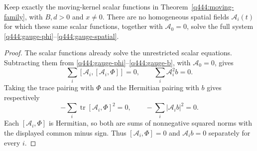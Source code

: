 \begin{theorem}
\label{q444:temporal-no-lift}
Keep exactly the moving-kernel scalar functions in
Theorem~\ref{q444:moving-family}, with $B,d>0$ and $x\neq0$.
There are no homogeneous spatial fields $\mathcal A_i(t)$ for which
these same scalar functions, together with $\mathcal A_0=0$, solve
the full system \eqref{q444:gauge-phi}--\eqref{q444:gauge-spatial}.
\end{theorem}
\begin{proof}
The scalar functions already solve the unrestricted scalar equations.
Subtracting them from \eqref{q444:gauge-phi}--\eqref{q444:gauge-b},
with $\mathcal A_0=0$, gives
\[
 \sum_i[\mathcal A_i,[\mathcal A_i,\Phi]]=0,\qquad
 \sum_i\mathcal A_i^2b=0.
\]
Taking the trace pairing with $\Phi$ and the Hermitian pairing with $b$
gives respectively
\[
 -\sum_i\operatorname{tr}[\mathcal A_i,\Phi]^2=0,\qquad
 -\sum_i|\mathcal A_i b|^2=0.
\]
Each $[\mathcal A_i,\Phi]$ is Hermitian, so both are sums of
nonnegative squared norms with the displayed common minus sign. Thus
$[\mathcal A_i,\Phi]=0$ and $\mathcal A_i b=0$ separately for every $i$.


\end{proof}

